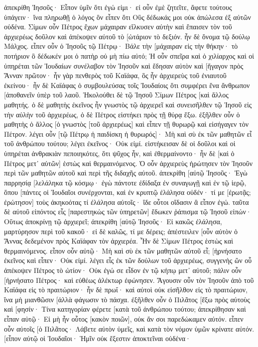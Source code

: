ἀπεκρίθη Ἰησοῦς· Εἶπον ὑμῖν ὅτι ἐγώ εἰμι· εἰ οὖν ἐμὲ ζητεῖτε, ἄφετε τούτους ὑπάγειν· 
ἵνα πληρωθῇ ὁ λόγος ὃν εἶπεν ὅτι Οὓς δέδωκάς μοι οὐκ ἀπώλεσα ἐξ αὐτῶν οὐδένα. 
Σίμων οὖν Πέτρος ἔχων μάχαιραν εἵλκυσεν αὐτὴν καὶ ἔπαισεν τὸν τοῦ ἀρχιερέως δοῦλον καὶ ἀπέκοψεν αὐτοῦ τὸ [ὠτάριον τὸ δεξιόν. ἦν δὲ ὄνομα τῷ δούλῳ Μάλχος. 
εἶπεν οὖν ὁ Ἰησοῦς τῷ Πέτρῳ· Βάλε τὴν [μάχαιραν εἰς τὴν θήκην· τὸ ποτήριον ὃ δέδωκέν μοι ὁ πατὴρ οὐ μὴ πίω αὐτό; 
Ἡ οὖν σπεῖρα καὶ ὁ χιλίαρχος καὶ οἱ ὑπηρέται τῶν Ἰουδαίων συνέλαβον τὸν Ἰησοῦν καὶ ἔδησαν αὐτὸν 
καὶ [ἤγαγον πρὸς Ἅνναν πρῶτον· ἦν γὰρ πενθερὸς τοῦ Καϊάφα, ὃς ἦν ἀρχιερεὺς τοῦ ἐνιαυτοῦ ἐκείνου· 
ἦν δὲ Καϊάφας ὁ συμβουλεύσας τοῖς Ἰουδαίοις ὅτι συμφέρει ἕνα ἄνθρωπον [ἀποθανεῖν ὑπὲρ τοῦ λαοῦ. 
Ἠκολούθει δὲ τῷ Ἰησοῦ Σίμων Πέτρος [καὶ ἄλλος μαθητής. ὁ δὲ μαθητὴς ἐκεῖνος ἦν γνωστὸς τῷ ἀρχιερεῖ καὶ συνεισῆλθεν τῷ Ἰησοῦ εἰς τὴν αὐλὴν τοῦ ἀρχιερέως, 
ὁ δὲ Πέτρος εἱστήκει πρὸς τῇ θύρᾳ ἔξω. ἐξῆλθεν οὖν ὁ μαθητὴς ὁ ἄλλος [ὁ γνωστὸς [τοῦ ἀρχιερέως] καὶ εἶπεν τῇ θυρωρῷ καὶ εἰσήγαγεν τὸν Πέτρον. 
λέγει οὖν [τῷ Πέτρῳ ἡ παιδίσκη ἡ θυρωρός]· Μὴ καὶ σὺ ἐκ τῶν μαθητῶν εἶ τοῦ ἀνθρώπου τούτου; λέγει ἐκεῖνος· Οὐκ εἰμί. 
εἱστήκεισαν δὲ οἱ δοῦλοι καὶ οἱ ὑπηρέται ἀνθρακιὰν πεποιηκότες, ὅτι ψῦχος ἦν, καὶ ἐθερμαίνοντο· ἦν δὲ [καὶ ὁ Πέτρος μετ᾽ αὐτῶν] ἑστὼς καὶ θερμαινόμενος. 
Ὁ οὖν ἀρχιερεὺς ἠρώτησεν τὸν Ἰησοῦν περὶ τῶν μαθητῶν αὐτοῦ καὶ περὶ τῆς διδαχῆς αὐτοῦ. 
ἀπεκρίθη [αὐτῷ Ἰησοῦς· Ἐγὼ παρρησίᾳ [λελάληκα τῷ κόσμῳ· ἐγὼ πάντοτε ἐδίδαξα ἐν συναγωγῇ καὶ ἐν τῷ ἱερῷ, ὅπου [πάντες οἱ Ἰουδαῖοι συνέρχονται, καὶ ἐν κρυπτῷ ἐλάλησα οὐδέν· 
τί με [ἐρωτᾷς; ἐρώτησον] τοὺς ἀκηκοότας τί ἐλάλησα αὐτοῖς· ἴδε οὗτοι οἴδασιν ἃ εἶπον ἐγώ. 
ταῦτα δὲ αὐτοῦ εἰπόντος εἷς [παρεστηκὼς τῶν ὑπηρετῶν] ἔδωκεν ῥάπισμα τῷ Ἰησοῦ εἰπών· Οὕτως ἀποκρίνῃ τῷ ἀρχιερεῖ; 
ἀπεκρίθη [αὐτῷ Ἰησοῦς· Εἰ κακῶς ἐλάλησα, μαρτύρησον περὶ τοῦ κακοῦ· εἰ δὲ καλῶς, τί με δέρεις; 
ἀπέστειλεν [οὖν αὐτὸν ὁ Ἅννας δεδεμένον πρὸς Καϊάφαν τὸν ἀρχιερέα. 
Ἦν δὲ Σίμων Πέτρος ἑστὼς καὶ θερμαινόμενος. εἶπον οὖν αὐτῷ· Μὴ καὶ σὺ ἐκ τῶν μαθητῶν αὐτοῦ εἶ; [ἠρνήσατο ἐκεῖνος καὶ εἶπεν· Οὐκ εἰμί. 
λέγει εἷς ἐκ τῶν δούλων τοῦ ἀρχιερέως, συγγενὴς ὢν οὗ ἀπέκοψεν Πέτρος τὸ ὠτίον· Οὐκ ἐγώ σε εἶδον ἐν τῷ κήπῳ μετ᾽ αὐτοῦ; 
πάλιν οὖν [ἠρνήσατο Πέτρος· καὶ εὐθέως ἀλέκτωρ ἐφώνησεν. 
Ἄγουσιν οὖν τὸν Ἰησοῦν ἀπὸ τοῦ Καϊάφα εἰς τὸ πραιτώριον· ἦν δὲ πρωΐ· καὶ αὐτοὶ οὐκ εἰσῆλθον εἰς τὸ πραιτώριον, ἵνα μὴ μιανθῶσιν [ἀλλὰ φάγωσιν τὸ πάσχα. 
ἐξῆλθεν οὖν ὁ Πιλᾶτος [ἔξω πρὸς αὐτοὺς καὶ [φησίν· Τίνα κατηγορίαν φέρετε [κατὰ τοῦ ἀνθρώπου τούτου; 
ἀπεκρίθησαν καὶ εἶπαν αὐτῷ· Εἰ μὴ ἦν οὗτος [κακὸν ποιῶν], οὐκ ἄν σοι παρεδώκαμεν αὐτόν. 
εἶπεν οὖν αὐτοῖς [ὁ Πιλᾶτος· Λάβετε αὐτὸν ὑμεῖς, καὶ κατὰ τὸν νόμον ὑμῶν κρίνατε αὐτόν. [εἶπον αὐτῷ οἱ Ἰουδαῖοι· Ἡμῖν οὐκ ἔξεστιν ἀποκτεῖναι οὐδένα· 

